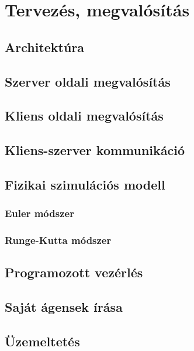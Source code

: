 \chapter{Tervezés, megvalósítás}

\section{Architektúra}

\section{Szerver oldali megvalósítás}

\section{Kliens oldali megvalósítás}

\section{Kliens-szerver kommunikáció}

\section{Fizikai szimulációs modell}

\subsection{Euler módszer}

\subsection{Runge-Kutta módszer}

\section{Programozott vezérlés}

\section{Saját ágensek írása}

\section{Üzemeltetés}
